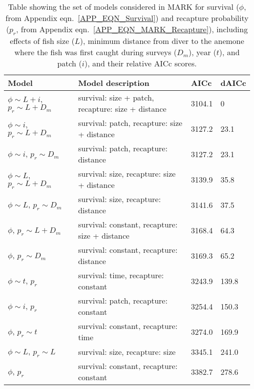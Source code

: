 \documentclass[12pt, oneside]{article}   	%
\begin{document}
\begin{table}[!htbp]
\begin{centering}
\caption{Table showing the set of models considered in MARK for survival ($\phi$, from Appendix eqn.\ \ref{APP_EQN_Survival}) and recapture probability ($p_r$, from Appendix eqn.\ \ref{APP_EQN_MARK_Recapture}), including effects of fish size ($L$), minimum distance from diver to the anemone where the fish was first caught during surveys ($D_m$), year ($t$), and patch ($i$), and their relative AICc scores.}\label{APP_TAB_MARKmodels}
\begin{tabular}{|p{1.75in}|p{2.75in}|p{0.75in}|p{0.75in}|}
\hline 
\textbf{Model} & \textbf{Model description} & \textbf{AICc} & \textbf{dAICc} \\ \hline
$\phi \sim L+i$, $p_r \sim L+D_m$ & survival: size + patch, recapture: size + distance & 3104.1 & 0 \\ \hline
$\phi \sim i$, $p_r \sim L+D_m$ & survival: patch, recapture: size + distance & 3127.2 & 23.1 \\ \hline
$\phi \sim i$, $p_r \sim D_m$ & survival: patch, recapture: distance & 3127.2 & 23.1 \\ \hline
$\phi \sim L$, $p_r \sim L+D_m$ & survival: size, recapture: size + distance & 3139.9 & 35.8 \\ \hline
$\phi \sim L$, $p_r \sim D_m$ & survival: size, recapture: distance & 3141.6 & 37.5 \\ \hline
$\phi$, $p_r \sim L+D_m$ & survival: constant, recapture: size + distance & 3168.4 & 64.3 \\ \hline
$\phi$, $p_r \sim D_m$ & survival: constant, recapture: distance & 3169.3 & 65.2 \\ \hline
$\phi \sim t$, $p_r$ & survival: time, recapture: constant & 3243.9 & 139.8 \\ \hline
$\phi \sim i$, $p_r$ & survival: patch, recapture: constant & 3254.4 & 150.3 \\ \hline
$\phi$, $p_r \sim t$ & survival: constant, recapture: time & 3274.0 & 169.9 \\ \hline
$\phi \sim L$, $p_r \sim L$ & survival: size, recapture: size & 3345.1 & 241.0 \\ \hline
$\phi$, $p_r$ & survival: constant, recapture: constant & 3382.7 & 278.6 \\ \hline
\end{tabular}
\end{centering}
\end{table}
\end{document}
